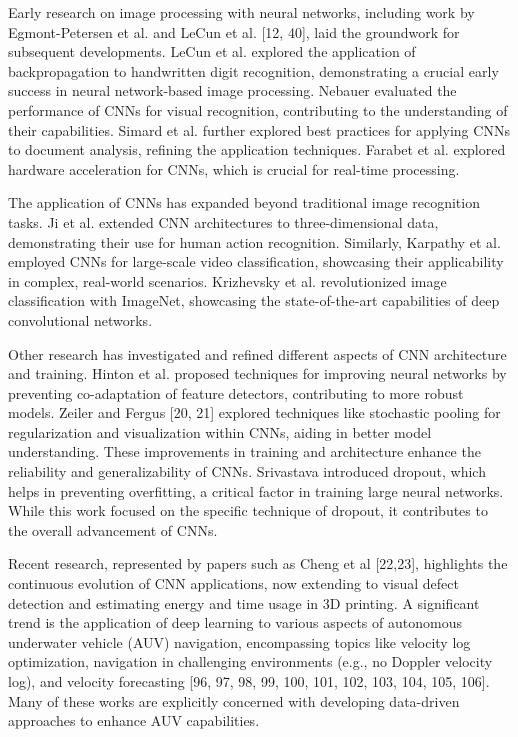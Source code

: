 \documentclass{article}
\begin{document}
Early research on image processing with neural networks, including work by Egmont-Petersen et al. \cite{5} and LeCun et al. [12, 40], laid the groundwork for subsequent developments.  LeCun et al. \cite{13} explored the application of backpropagation to handwritten digit recognition, demonstrating a crucial early success in neural network-based image processing.   Nebauer \cite{14}  evaluated the performance of CNNs for visual recognition, contributing to the understanding of their capabilities. Simard et al. \cite{15} further explored best practices for applying CNNs to document analysis, refining the application techniques.  Farabet et al. \cite{6} explored hardware acceleration for CNNs, which is crucial for real-time processing.


The application of CNNs has expanded beyond traditional image recognition tasks.  Ji et al. \cite{9} extended CNN architectures to three-dimensional data, demonstrating their use for human action recognition.  Similarly, Karpathy et al. \cite{10} employed CNNs for large-scale video classification, showcasing their applicability in complex, real-world scenarios. Krizhevsky et al. \cite{11} revolutionized image classification with ImageNet, showcasing the state-of-the-art capabilities of deep convolutional networks.

Other research has investigated and refined different aspects of CNN architecture and training.  Hinton et al. \cite{8} proposed techniques for improving neural networks by preventing co-adaptation of feature detectors, contributing to more robust models.  Zeiler and Fergus [20, 21] explored techniques like stochastic pooling for regularization and visualization within CNNs, aiding in better model understanding.  These improvements in training and architecture enhance the reliability and generalizability of CNNs.   Srivastava \cite{16} introduced dropout, which helps in preventing overfitting, a critical factor in training large neural networks.  While this work focused on the specific technique of dropout, it contributes to the overall advancement of CNNs.

Recent research, represented by papers such as Cheng et al [22,23],  highlights the continuous evolution of CNN applications, now extending to visual defect detection and estimating energy and time usage in 3D printing. A significant trend is the application of deep learning to various aspects of autonomous underwater vehicle (AUV) navigation, encompassing topics like velocity log optimization, navigation in challenging environments (e.g., no Doppler velocity log), and velocity forecasting [96, 97, 98, 99, 100, 101, 102, 103, 104, 105, 106].  Many of these works are explicitly concerned with developing data-driven approaches to enhance AUV capabilities.
\end{document}
